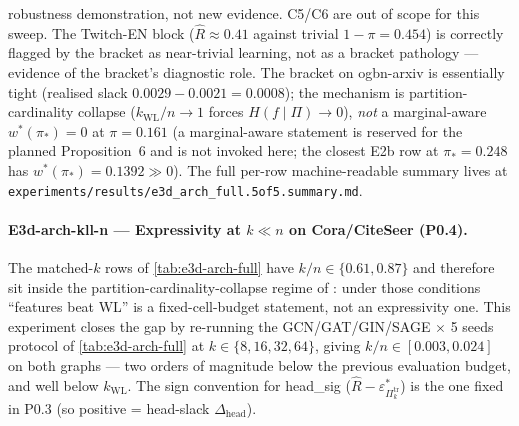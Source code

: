 \documentclass[10pt]{article}
\theoremstyle{definition}
\theoremstyle{remark}
\newcommand{\eps}{\varepsilon}
\begin{document}
robustness demonstration, not new evidence. C5/C6 are out of
scope for this sweep. The Twitch-EN block ($\hat R \approx 0.41$
against trivial $1 - \pi = 0.454$) is correctly flagged by the
bracket as near-trivial learning, not as a bracket pathology
--- evidence of the bracket's diagnostic role. The bracket on
ogbn-arxiv is essentially tight (realised slack $0.0029 -
0.0021 = 0.0008$); the mechanism is partition-cardinality
collapse ($k_{\mathrm{WL}}/n \to 1$ forces $H(f \mid \Pi)
\to 0$), \emph{not} a marginal-aware $w^{*}(\pi_{*}) = 0$ at
$\pi = 0.161$ (a marginal-aware statement is reserved for the
planned Proposition~6 and is not invoked here; the closest E2b
row at $\pi_{*} = 0.248$ has $w^{*}(\pi_{*}) = 0.1392 \gg 0$).
The full per-row machine-readable summary lives at
\texttt{experiments/results/e3d\_arch\_full.5of5.summary.md}.

\paragraph{E3d-arch-kll-n --- Expressivity at $k\ll n$ on
Cora/CiteSeer (P0.4).} The matched-$k$ rows of
\cref{tab:e3d-arch-full} have $k/n \in \{0.61, 0.87\}$ and
therefore sit inside the partition-cardinality-collapse regime
of : under those conditions
``features beat WL'' is a fixed-cell-budget statement, not an
expressivity one. This experiment closes the gap by re-running
the GCN/GAT/GIN/SAGE $\times$ 5 seeds protocol of
\cref{tab:e3d-arch-full} at $k\in\{8,16,32,64\}$, giving
$k/n \in [0.003, 0.024]$ on both graphs --- two orders of
magnitude below the previous evaluation budget, and well below
$k_{\mathrm{WL}}$. The sign convention for head\_sig
($\hat R - \eps^{*}_{\Pi^{\mathrm{tr}}_{k}}$) is the one fixed
in P0.3 (so positive = head-slack $\Delta_{\mathrm{head}}$).
\end{document}
